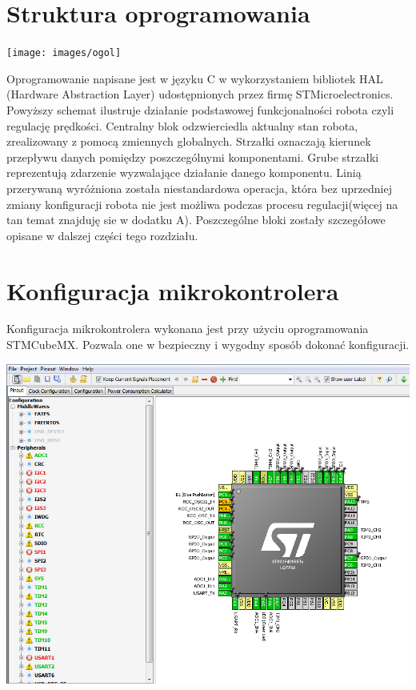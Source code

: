 \documentclass[eng,printmode]{mgr}
\begin{document}
 \section{Struktura oprogramowania}
   \begin{center}
    \texttt{[image: images/ogol]}
   \end{center}

Oprogramowanie napisane jest w języku C w wykorzystaniem bibliotek HAL (Hardware Abstraction Layer) udostępnionych przez firmę STMicroelectronics. Powyższy schemat ilustruje działanie podstawowej funkcjonalności robota czyli regulację prędkości. 
Centralny blok odzwierciedla aktualny stan robota, zrealizowany z pomocą zmiennych globalnych. Strzałki  oznaczają kierunek przepływu danych pomiędzy poszczególnymi komponentami. Grube strzałki reprezentują zdarzenie wyzwalające działanie danego komponentu. Linią przerywaną wyróżniona została niestandardowa operacja, która bez uprzedniej zmiany konfiguracji robota nie jest możliwa podczas procesu regulacji(więcej na tan temat znajduję sie w dodatku A). Poszczególne bloki zostały szczegółowe opisane w dalszej części tego rozdziału.
 \section{Konfiguracja mikrokontrolera}

Konfiguracja mikrokontrolera wykonana jest przy użyciu oprogramowania STMCubeMX. Pozwala one w bezpieczny i wygodny sposób dokonać konfiguracji.

   \begin{center}
    \includegraphics[width=1\textwidth]{images/cubemx1}
   \end{center}
\end{document}
